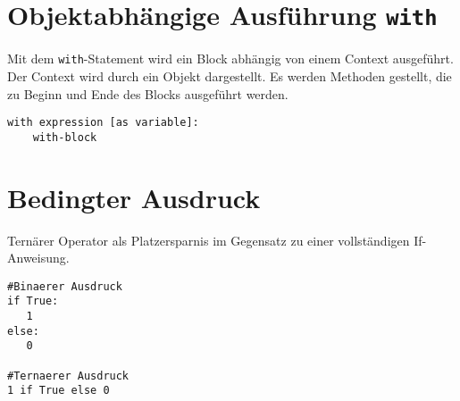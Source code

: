 \section{Objektabhängige Ausführung \texttt{with}}
Mit dem \texttt{with}-Statement wird ein Block abhängig von einem Context ausgeführt. Der Context wird durch ein Objekt dargestellt. Es werden Methoden gestellt, die zu Beginn und Ende des Blocks ausgeführt werden.
\begin{lstlisting}
with expression [as variable]:
    with-block
\end{lstlisting}
\section{Bedingter Ausdruck}
Ternärer Operator als Platzersparnis im Gegensatz zu einer vollständigen If-Anweisung.
\begin{lstlisting}
#Binaerer Ausdruck
if True:
   1
else:
   0

#Ternaerer Ausdruck
1 if True else 0


\end{lstlisting}

